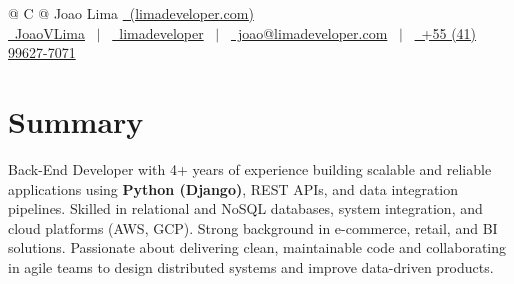\documentclass[a4paper,12pt]{article}
\begin{document}
    \pagestyle{empty}



    \begin{tabularx}{\linewidth}{@{} C @{}}
        \Huge{Joao Lima} \href{https://limadeveloper.com}{\raisebox{-0.05\height}\ (limadeveloper.com)} \ \\[7.5pt]
        \href{https://github.com/JoaoVLima}{\raisebox{-0.05\height}\faGithub\ JoaoVLima} \ $|$ \
        \href{https://linkedin.com/in/limadeveloper}{\raisebox{-0.05\height}\faLinkedin\ limadeveloper} \ $|$ \
        \href{mailto:joao@limadeveloper.com}{\raisebox{-0.05\height}\faEnvelope \ joao@limadeveloper.com} \ $|$ \
        \href{tel:+5541996277071}{\raisebox{-0.05\height}\faMobile \ +55 (41) 99627-7071} \\
    \end{tabularx}




    \section{Summary}
    Back-End Developer with 4+ years of experience building scalable and reliable applications using \textbf{Python (Django)}, REST APIs, and data integration pipelines. Skilled in relational and NoSQL databases, system integration, and cloud platforms (AWS, GCP). Strong background in e-commerce, retail, and BI solutions. Passionate about delivering clean, maintainable code and collaborating in agile teams to design distributed systems and improve data-driven products.
\end{document}
